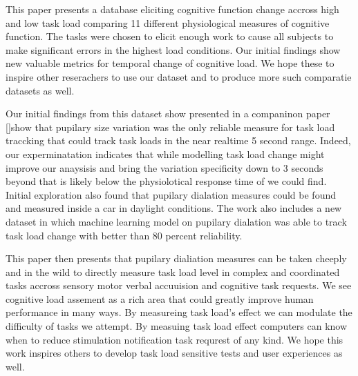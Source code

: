 This paper presents a database eliciting cognitive function change accross high and low task load comparing 11 different physiological measures of cognitive function.  The tasks were chosen to elicit enough work to cause all subjects to make significant errors in the highest load conditions. Our initial findings show new valuable metrics for temporal change of cognitive load. We hope these to inspire other reserachers to use our dataset and to produce more such comparatie datasets as well.  


Our initial findings from this dataset show presented in a companinon paper []show that pupilary size variation was the only reliable measure for task load traccking that could track task loads in the near realtime 5 second range.  Indeed, our experminatation indicates that while modelling task load change might improve our anaysisis and bring the variation specificity down to 3 seconds beyond that is likely below the physiolotical response time of we could find.  
Initial exploration also found that pupilary dialation measures could be found and measured inside a car in daylight conditions.  The work also includes a new dataset in which machine learning model  on pupilary dialation was able to track task load change with better than 80 percent reliability.

This paper then presents that pupilary dialiation measures can be taken cheeply and in the wild to directly measure task load level in complex and coordinated tasks accross sensory motor verbal accuuision and cognitive task requests.
We see cognitive load assement as a rich area that could greatly improve human performance in many ways.  By measureing task load's effect we can modulate the difficulty of tasks we attempt.  By measuing task load effect computers can know when to reduce stimulation notification task requrest of any kind.  We hope this work inspires others to develop task load sensitive tests and user  experiences as well.




